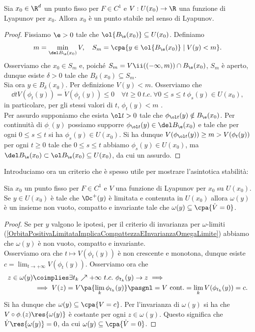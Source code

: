 \begin{theorem}\label{TeoremaLyapunov1Stabilita}
Sia $x_0\in\R^d$ un punto fisso per $F\in C^1$ e $V:U(x_0)\to\R$ una funzione di Lyapunov per $x_0$. Allora $x_0$ \`e un punto stabile nel senso di Lyapunov.
\end{theorem}
\begin{proof}
Fissiamo $\e>0$ tale che $\ol{B_\e(x_0)}\subseteq U(x_0)$. Definiamo \[m=\min_{\del B_\e(x_0)}V,\quad S_m=\cpa{y\in\ol{B_\e(x_0)}\mid V(y)< m}.\]
Osserviamo che $x_0\in S_m$ e, poich\'e $S_m=V\ii((-\infty,m))\cap B_\e(x_0)$, $S_m$ \`e aperto, dunque esiste $\delta>0$ tale che $B_\delta(x_0)\subseteq S_m$.\\
Sia ora $y\in B_\delta(x_0)$. Per definizione $V(y)< m$. Osserviamo che
\[\dd t{}V(\phi_t(y))=\dot V(\phi_t(y))\leq 0 \quad \forall t\geq 0\ t.c.\ \forall 0\leq s\leq t\ \phi_s(y)\in U(x_0),\]
in particolare, per gli stessi valori di $t$, $\phi_t(y)< m$ .\\
Per assurdo supponiamo che esista $\ol t>0$ tale che $\phi_{\ol t}(y)\notin B_\e(x_0)$. Per continuit\`a di $\phi_\cdot(y)$ possiamo supporre $\phi_{\ol t}(y)\in \del B_\e(x_0)$ e tale che per ogni $0\leq s\leq t$ si ha $\phi_s(y)\in U(x_0)$. Si ha dunque $V(\phi_{\ol t}(y))\geq m>V(\phi_t(y))$ per ogni $t\geq 0$ tale che $0\leq s\leq t$ abbiamo $\phi_s(y)\in U(x_0)$, ma $\del B_\e(x_0)\subset\ol B_\e(x_0)\subseteq U(x_0)$, da cui un assurdo.
\end{proof}

\noindent Introduciamo ora un criterio che \`e spesso utile per mostrare l'asintotica stabilit\`a:
\begin{proposition}\label{CriterioLaSalle}
Sia $x_0$ un punto fisso per $F\in C^1$ e $V$ una funzione di Lyapunov per $x_0$ su $U(x_0)$. Se $y\in U(x_0)$ \`e tale che $\Oc^+(y)$ \`e limitata e contenuta in $U(x_0)$ allora $\omega(y)$ \`e un insieme non vuoto, compatto e invariante tale che $\omega(y)\subseteq \cpa{\dot V=0}$.
\end{proposition}
\begin{proof}
Se per $y$ valgono le ipotesi, per il criterio di invarianza per $\omega$-limiti (\ref{OrbitaPositivaLimitataImplicaCompattezzaEInvarianzaOmegaLimite}) abbiamo che $\omega(y)$ \`e non vuoto, compatto e invariante.\\
Osserviamo ora che $t\mapsto V(\phi_t(y))$ \`e non crescente e monotona, dunque esiste $\displaystyle c=\lim_{t\to+\infty}V(\phi_t(y))$. Osserviamo ora che
\begin{align*}
z\in \omega(y)&\coimplies \exists t_k\nearrow +\infty \ t.c.\ \phi_{t_k}(y)\to z\implies\\
&\implies V(z)=V\pa{\lim_{k}\phi_{t_k}(y)}\pasgnl={V\text{ cont.}}=\lim_k V(\phi_{t_k}(y))=c.
\end{align*}
Si ha dunque che $\omega(y)\subseteq \cpa{V=c}$. Per l'invarianza di $\omega(y)$ si ha che $V\circ \phi_\cdot(z)\res{\omega(y)}$ \`e costante per ogni $z\in\omega(y)$.
Questo significa che $\dot V\res{\omega(y)}=0$, da cui $\omega(y)\subseteq \cpa{\dot V=0}$.
\end{proof}

